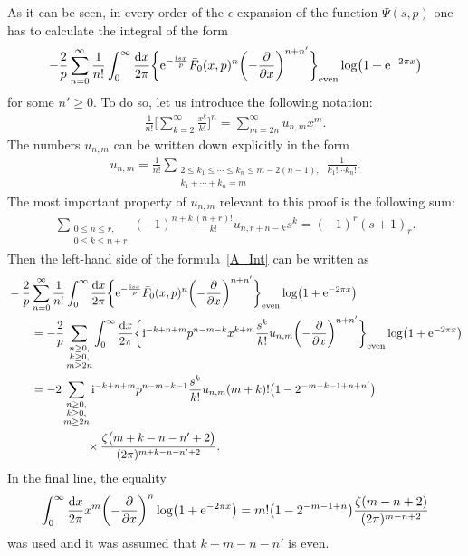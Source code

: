 \documentclass[10pt,a4paper]{amsart}
\numberwithin{equation}{section}
\begin{document}
As it can be seen, in every order of the $\epsilon$-expansion of the function $\Psi(s, p)$ one has to calculate the integral of the form
\begin{align}\label{A_Int}
-\frac{2}{p} \sum_{n=0}^{\infty} \frac{1}{n!} \int_{0}^{\infty} \frac{{\rm d}x}{2\pi} \biggl\{ {\rm e}^{-\frac{{\rm i}sx}{p}} \bar{F}_0(x, p)^n \biggl(-\frac{\partial}{\partial x}\biggr)^{n+n'} \biggr\}_{\text{even}} \log\bigl(1+{\rm e}^{-2\pi x}\bigr)
\end{align}
for some $n'\geq 0$. To do so, let us introduce the following notation:
\begin{align*}%
\frac{1}{n!}\Biggl[ \sum_{k=2}^{\infty} \frac{x^k}{k!} \Biggr]^n=
\sum_{m=2n}^{\infty} u_{n, m} x^m.
\end{align*}
The numbers $u_{n, m}$ can be written down explicitly in the form
\begin{align*}
u_{n, m}=\frac{1}{n!} \sum_{\substack{2\leq k_1 \leq\cdots\leq k_n \leq m-2(n-1), \\ k_1+\cdots+k_n=m}} \frac{1}{k_1! \cdots k_n!}.
\end{align*}
The most important property of $u_{n, m}$ relevant to this proof is the following sum:
\begin{align}\label{A_u_1}
\sum_{\substack{0 \leq n \leq r, \\ 0 \leq k \leq n+r}} (-1)^{n+k} \frac{(n+r)!}{k!} u_{n, r+n-k} s^k=(-1)^r (s+1)_r.
\end{align}
Then the left-hand side of the formula~\eqref{A_Int} can be written as
\begin{align}
&-\frac{2}{p} \sum_{n=0}^{\infty} \frac{1}{n!} \int_{0}^{\infty} \frac{{\rm d}x}{2\pi} \biggl\{ {\rm e}^{-\frac{{\rm i}sx}{p}} \bar{F}_0(x, p)^n \biggl(-\frac{\partial}{\partial x}\biggr)^{n+n'} \biggr\}_{\text{even}} \log\bigl(1+{\rm e}^{-2\pi x}\bigr)\nonumber\\
&\qquad{}=-\frac{2}{p} \sum_{\substack{n \geq 0, \\ k \geq 0, \\ m \geq 2n}} \int_{0}^{\infty} \frac{{\rm d}x}{2\pi}
    \biggl\{{\rm i}^{-k+n+m} p^{n-m-k} x^{k+m} \frac{s^k}{k!} u_{n, m} \biggl(-\frac{\partial}{\partial x}\biggr)^{n+n'} \biggr\}_{\text{even}} \log\bigl(1+{\rm e}^{-2\pi x}\bigr)\cr
&\qquad{} =-2\sum_{\substack{n \geq 0,\\ k \geq 0, \\ m \geq 2n}} {\rm i}^{-k+n+m} p^{n-m-k-1} \frac{s^k}{k!} u_{n, m} (m+k)! \bigl(1-2^{-m-k-1+n+n'}\bigr)\nonumber\\
&\qquad\hphantom{=-2\sum_{\substack{n \geq 0,\\ k \geq 0, \\ m \geq 2n}}}{}
\times\frac{\zeta\bigl(m+k-n-n'+2\bigr)}{(2\pi)^{m+k-n-n'+2}}.\label{A_2}
\end{align}
In the final line, the equality
\begin{align*}
\int_{0}^{\infty} \frac{{\rm d}x}{2\pi} x^{m} \biggl(-\frac{\partial}{\partial x}\biggr)^n \log\bigl(1+{\rm e}^{-2\pi x}\bigr) = m!\bigl(1-2^{-m-1+n}\bigr) \frac{\zeta(m-n+2)}{(2\pi)^{m-n+2}}
\end{align*}
was used and it was assumed that $k+m-n-n'$ is even.
\end{document}
